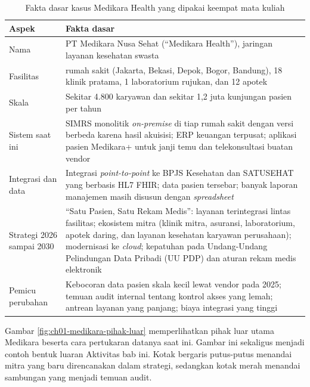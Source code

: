 \begin{table}[!htb]
  \centering
  \caption{Fakta dasar kasus Medikara Health yang dipakai keempat mata kuliah}
  \label{tab:ch01-profil-medikara}
  \begin{tabularx}{\textwidth}{>{\raggedright\arraybackslash}p{2.6cm}
                               >{\raggedright\arraybackslash}X}
    \hline
    \textbf{Aspek} & \textbf{Fakta dasar} \\
    \hline
    Nama & PT Medikara Nusa Sehat (``Medikara Health''), jaringan layanan kesehatan swasta \\
    \hline
    Fasilitas & 5 rumah sakit (Jakarta, Bekasi, Depok, Bogor, Bandung), 18 klinik pratama, 1 laboratorium rujukan, dan 12 apotek \\
    \hline
    Skala & Sekitar 4.800 karyawan dan sekitar 1,2 juta kunjungan pasien per tahun \\
    \hline
    Sistem saat ini & SIMRS monolitik \textit{on-premise} di tiap rumah sakit dengan versi berbeda karena hasil akuisisi; ERP keuangan terpusat; aplikasi pasien Medikara+ untuk janji temu dan telekonsultasi buatan vendor \\
    \hline
    Integrasi dan data & Integrasi \textit{point-to-point} ke BPJS Kesehatan dan SATUSEHAT yang berbasis HL7 FHIR; data pasien tersebar; banyak laporan manajemen masih disusun dengan \textit{spreadsheet} \\
    \hline
    Strategi 2026 sampai 2030 & ``Satu Pasien, Satu Rekam Medis'': layanan terintegrasi lintas fasilitas; ekosistem mitra (klinik mitra, asuransi, laboratorium, apotek daring, dan layanan kesehatan karyawan perusahaan); modernisasi ke \textit{cloud}; kepatuhan pada Undang-Undang Pelindungan Data Pribadi (UU PDP) dan aturan rekam medis elektronik \\
    \hline
    Pemicu perubahan & Kebocoran data pasien skala kecil lewat vendor pada 2025; temuan audit internal tentang kontrol akses yang lemah; antrean layanan yang panjang; biaya integrasi yang tinggi \\
    \hline
  \end{tabularx}
\end{table}

Gambar \ref{fig:ch01-medikara-pihak-luar} memperlihatkan pihak luar utama
Medikara beserta cara pertukaran datanya saat ini. Gambar ini sekaligus menjadi
contoh bentuk luaran Aktivitas bab ini. Kotak bergaris putus-putus menandai mitra
yang baru direncanakan dalam strategi, sedangkan kotak merah menandai sambungan
yang menjadi temuan audit.

